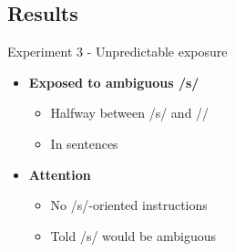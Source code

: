 \documentclass{beamer}
\begin{document}
\subsection{Results}

\begin{frame}{Experiment 3 - Unpredictable exposure}

\begin{minipage}{0.45\textwidth}
\begin{itemize}
\item \textbf{Exposed to ambiguous /s/}
\begin{itemize}
\item Halfway between /s/ and /\textesh/
\item In sentences
\end{itemize}

\item \textbf{Attention}
\begin{itemize}
\item No /s/-oriented instructions
\item Told /s/ would be ambiguous
\end{itemize}


\end{itemize}
\end{minipage}
\end{frame}
\end{document}
